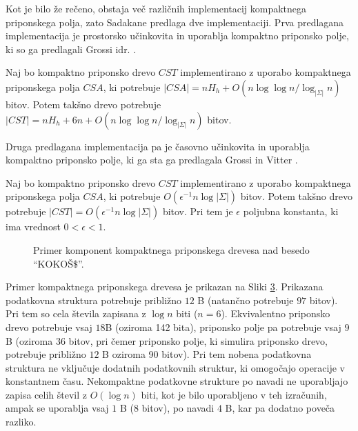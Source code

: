 Kot je bilo že rečeno, obstaja več različnih implementacij kompaktnega priponskega polja, zato Sadakane \cite{Sadakane2007} predlaga dve implementaciji. Prva predlagana implementacija je prostorsko učinkovita in uporablja kompaktno priponsko polje, ki so ga predlagali Grossi idr. \cite{Grossi2003}. 

\begin{posl}\label{pos:CSAnh}
    Naj bo kompaktno priponsko drevo $CST$ implementirano z uporabo kompaktnega priponskega polja $CSA$, ki potrebuje $|CSA|=nH_h+O(n\log\log{n} / \log_{| \Sigma|}{n})$ bitov. Potem takšno drevo potrebuje $|CST| = nH_h+6n+O(n\log\log{n} / \log_{|\Sigma|}{n})$ bitov.    
\end{posl}

Druga predlagana implementacija pa je časovno učinkovita in uporablja kompaktno priponsko polje, ki ga sta ga predlagala Grossi in Vitter \cite{Grossi2000}. 
\begin{posl}\label{pos:CSAlog}
    Naj bo kompaktno priponsko drevo $CST$ implementirano z uporabo kompaktnega priponskega polja $CSA$, ki potrebuje $O(\epsilon^{-1}n\log{|\Sigma|})$ bitov. Potem takšno drevo potrebuje $|CST|=O(\epsilon^{-1}n\log{|\Sigma|})$ bitov. Pri tem je $\epsilon$ poljubna konstanta, ki ima vrednost $0<\epsilon<1$.
\end{posl}

\begin{figure}[htb]       
        \begin{subfigure}[t]{1\linewidth}       
            
            \centering
            \subcaption*{}
            \label{fig:neKompaktnoDrevo}
        \end{subfigure}
        \begin{subfigure}[t]{1\linewidth}        
            
            \centering
            \subcaption*{}
            \label{fig:KompaktnoPolje}
        \end{subfigure}
    \caption{Primer komponent kompaktnega priponskega drevesa nad besedo \enquote{KOKOŠ$\$$}.} 
    \label{fig:CST}
\end{figure}

Primer kompaktnega priponskega drevesa je prikazan na Sliki \ref{fig:CST}. Prikazana podatkovna struktura potrebuje približno $12$ B (natančno potrebuje $97$ bitov). Pri tem so cela števila zapisana z $\log{n}$ biti ($n=6$). Ekvivalentno priponsko drevo potrebuje vsaj $18$B (oziroma 142 bita), priponsko polje pa potrebuje vsaj $9$ B (oziroma 36 bitov, pri čemer priponsko polje, ki simulira priponsko drevo, potrebuje približno $12$ B oziroma 90 bitov). Pri tem nobena podatkovna struktura ne vključuje dodatnih podatkovnih struktur, ki omogočajo operacije v konstantnem času. Nekompaktne podatkovne strukture po navadi ne uporabljajo zapisa celih števil z $O(\log{n})$ biti, kot je bilo uporabljeno v teh izračunih, ampak se uporablja vsaj $1$ B (8 bitov), po navadi $4$ B, kar pa dodatno poveča razliko.

